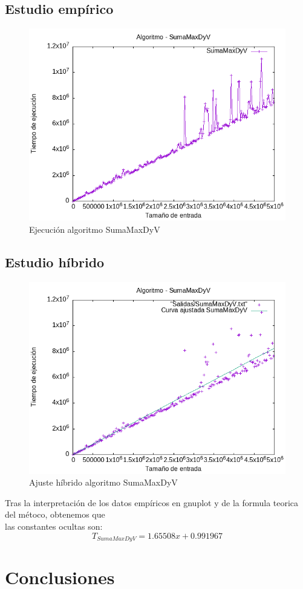 \documentclass[11pt,openany]{book}
\begin{document}
\section*{Estudio empírico}
\begin{center}
      \begin{figure}[h]
                \centering
                \includegraphics[width=0.8\linewidth]{../Codigos/Graficas/SumaMaxDyV.png}
                \caption{Ejecución algoritmo SumaMaxDyV}
                \label{fig:SumaMaxDyV}
      \end{figure}
\end{center}
\newpage
\section*{Estudio híbrido}
\begin{center}
      \begin{figure}[h]
              \centering
              \includegraphics[width=0.8\linewidth]{../Codigos/AjusteHibrido/SumaMaxDyV_hib.png}
              \caption{Ajuste híbrido algoritmo SumaMaxDyV}
              \label{fig:sumaMax}
      \end{figure}
\end{center}
  Tras la interpretación de los datos empíricos en gnuplot y de la formula teorica del métoco, obtenemos que \\
  las constantes ocultas son:
  \begin{equation*}
      T_{SumaMaxDyV}=1.65508x + 0.991967
  \end{equation*}
  


\chapter{Conclusiones}
\end{document}
